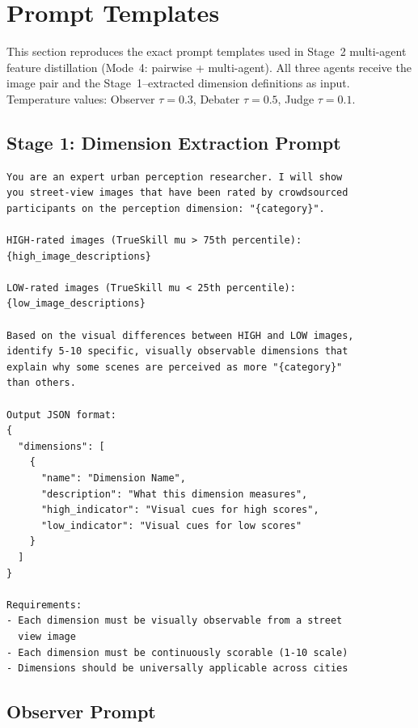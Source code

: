 \documentclass[runningheads]{llncs}
\begin{document}
\FloatBarrier
\section{Prompt Templates}
\label{sec:prompts}

This section reproduces the exact prompt templates used in Stage~2 multi-agent feature distillation (Mode~4: pairwise + multi-agent).
All three agents receive the image pair and the Stage~1--extracted dimension definitions as input.
Temperature values: Observer $\tau{=}0.3$, Debater $\tau{=}0.5$, Judge $\tau{=}0.1$.

\subsection{Stage 1: Dimension Extraction Prompt}

\begin{lstlisting}[caption={Dimension extraction prompt (Stage 1).}]
You are an expert urban perception researcher. I will show
you street-view images that have been rated by crowdsourced
participants on the perception dimension: "{category}".

HIGH-rated images (TrueSkill mu > 75th percentile):
{high_image_descriptions}

LOW-rated images (TrueSkill mu < 25th percentile):
{low_image_descriptions}

Based on the visual differences between HIGH and LOW images,
identify 5-10 specific, visually observable dimensions that
explain why some scenes are perceived as more "{category}"
than others.

Output JSON format:
{
  "dimensions": [
    {
      "name": "Dimension Name",
      "description": "What this dimension measures",
      "high_indicator": "Visual cues for high scores",
      "low_indicator": "Visual cues for low scores"
    }
  ]
}

Requirements:
- Each dimension must be visually observable from a street
  view image
- Each dimension must be continuously scorable (1-10 scale)
- Dimensions should be universally applicable across cities
\end{lstlisting}

\subsection{Observer Prompt}
\end{document}
